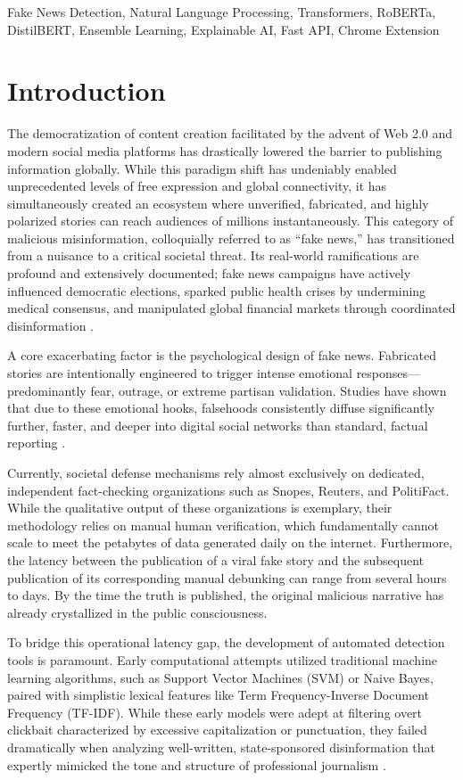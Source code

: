 \documentclass[conference]{IEEEtran}
\begin{document}
\begin{IEEEkeywords}
Fake News Detection, Natural Language Processing, Transformers, RoBERTa, DistilBERT, Ensemble Learning, Explainable AI, Fast API, Chrome Extension
\end{IEEEkeywords}

\section{Introduction}
The democratization of content creation facilitated by the advent of Web 2.0 and modern social media platforms has drastically lowered the barrier to publishing information globally. While this paradigm shift has undeniably enabled unprecedented levels of free expression and global connectivity, it has simultaneously created an ecosystem where unverified, fabricated, and highly polarized stories can reach audiences of millions instantaneously. This category of malicious misinformation, colloquially referred to as ``fake news,'' has transitioned from a nuisance to a critical societal threat. Its real-world ramifications are profound and extensively documented; fake news campaigns have actively influenced democratic elections, sparked public health crises by undermining medical consensus, and manipulated global financial markets through coordinated disinformation \cite{b4}. 

A core exacerbating factor is the psychological design of fake news. Fabricated stories are intentionally engineered to trigger intense emotional responses—predominantly fear, outrage, or extreme partisan validation. Studies have shown that due to these emotional hooks, falsehoods consistently diffuse significantly further, faster, and deeper into digital social networks than standard, factual reporting \cite{b9}.

Currently, societal defense mechanisms rely almost exclusively on dedicated, independent fact-checking organizations such as Snopes, Reuters, and PolitiFact. While the qualitative output of these organizations is exemplary, their methodology relies on manual human verification, which fundamentally cannot scale to meet the petabytes of data generated daily on the internet. Furthermore, the latency between the publication of a viral fake story and the subsequent publication of its corresponding manual debunking can range from several hours to days. By the time the truth is published, the original malicious narrative has already crystallized in the public consciousness. 

To bridge this operational latency gap, the development of automated detection tools is paramount. Early computational attempts utilized traditional machine learning algorithms, such as Support Vector Machines (SVM) or Naive Bayes, paired with simplistic lexical features like Term Frequency-Inverse Document Frequency (TF-IDF). While these early models were adept at filtering overt clickbait characterized by excessive capitalization or punctuation, they failed dramatically when analyzing well-written, state-sponsored disinformation that expertly mimicked the tone and structure of professional journalism \cite{b5}. 
\end{document}
